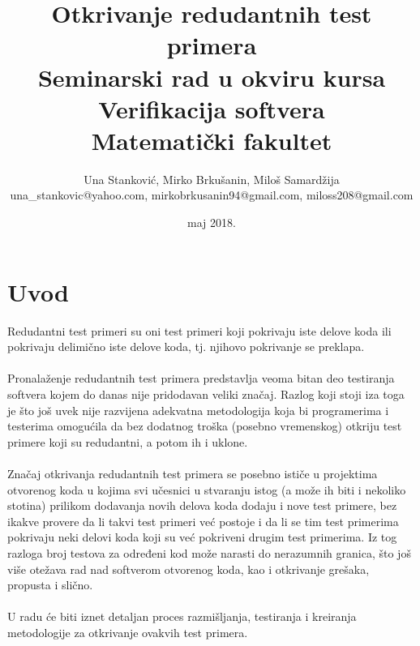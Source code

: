 \documentclass[a4paper]{article}
\begin{document}
\title{Otkrivanje redudantnih test primera\\ \small{Seminarski rad u okviru kursa\\Verifikacija softvera\\ Matematički fakultet}}

\author{Una Stanković, Mirko Brkušanin, Miloš Samardžija\\ una\_stankovic@yahoo.com, mirkobrkusanin94@gmail.com, miloss208@gmail.com}
\date{maj 2018.}
\maketitle


\tableofcontents
 
\newpage

\section{Uvod}
\label{sec:introduction}
Redudantni test primeri su oni test primeri koji pokrivaju iste delove koda ili pokrivaju delimično iste delove koda, tj. njihovo pokrivanje se preklapa.\\\\
Pronalaženje redudantnih test primera predstavlja veoma bitan deo testiranja softvera kojem do danas nije pridodavan veliki značaj. Razlog koji stoji iza toga je što još uvek nije razvijena adekvatna metodologija koja bi programerima i testerima omogućila da bez dodatnog troška (posebno vremenskog) otkriju test primere koji su redudantni, a potom ih i uklone.\\\\
Značaj otkrivanja redudantnih test primera se posebno ističe u projektima otvorenog koda u kojima svi učesnici u stvaranju istog (a može ih biti i nekoliko stotina) prilikom dodavanja novih delova koda dodaju i nove test primere, bez ikakve provere da li takvi test primeri već postoje i da li se tim test primerima pokrivaju neki delovi koda koji su već pokriveni drugim test primerima. Iz tog razloga broj testova za određeni kod može narasti do nerazumnih granica, što još više otežava rad nad softverom otvorenog koda, kao i otkrivanje grešaka, propusta i slično. \\\\
U radu će biti iznet detaljan proces razmišljanja, testiranja i kreiranja metodologije za otkrivanje ovakvih test primera.
\end{document}
